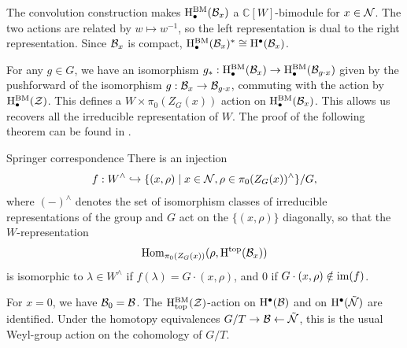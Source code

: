 The convolution construction makes $\mathrm{H}^\mathrm{BM}_\bullet(\mathcal{B}_x)$ a
$\mathbb{C}[W]$-bimodule for $x\in\mathcal{N}$. The two actions are
related by $w\mapsto w^{-1}$, so the left representation is dual to
the right representation. Since $\mathcal{B}_x$ is compact,
$\mathrm{H}^\mathrm{BM}_\bullet(\mathcal{B}_x)^*\cong\mathrm{H}^\bullet(\mathcal{B}_x)$.

For any $g \in G$, we have an isomorphism $g_* : \mathrm{H}^\mathrm{BM}_\bullet(\mathcal{B}_x) \to \mathrm{H}^\mathrm{BM}_\bullet(\mathcal{B}_{g \cdot x})$ given by the pushforward of the isomorphism $g : \mathcal{B}_x \to \mathcal{B}_{g \cdot x}$, commuting with the action by $\mathrm{H}^\mathrm{BM}_\bullet(\mathcal{Z})$. This defines a $W \times \pi_0(Z_G(x))$ action on $\mathrm{H}^\mathrm{BM}_\bullet(\mathcal{B}_x)$. This allows us recovers all the irreducible representation of $W$. The proof of the following theorem can be found in \cite[Section 3]{chriss1997representation}.

\begin{theorem}{Springer correspondence}
    There is an injection
    \begin{equation*}
        f : W^\wedge \hookrightarrow \{ (x, \rho) \mid x \in \mathcal{N}, \rho \in \pi_0(Z_G(x))^\wedge \}/G,
    \end{equation*}
    where $(-)^\wedge$ denotes the set of isomorphism classes of irreducible representations of the group and $G$ act on the $\{(x, \rho)\}$ diagonally, so that the $W$-representation
    \begin{equation*}
        \mathrm{Hom}_{\pi_0(Z_G(x))}(\rho, \mathrm{H}^\mathrm{top}(\mathcal{B}_x))
    \end{equation*}
    is isomorphic to $\lambda \in W^\wedge$ if $f(\lambda) = G \cdot (x, \rho)$, and $0$ if $G \cdot (x, \rho) \notin \operatorname{im}(f)$.
\end{theorem}

For $x = 0$, we have $\mathcal{B}_0 = \mathcal{B}$. The $\mathrm{H}^\mathrm{BM}_\mathrm{top}(\mathcal{Z})$-action on $\mathrm{H}^\bullet(\mathcal{B})$ and on $\mathrm{H}^\bullet(\tilde{\mathcal{N}})$ are identified. Under the homotopy equivalences $G/T\to\mathcal{B}\gets\tilde{\mathcal{N}}$, this is the usual Weyl-group action on the cohomology of $G/T$.


